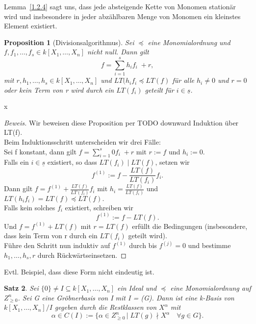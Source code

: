 \documentclass{article}
\newtheorem{satz}{Satz}
\newtheorem{proposition}[satz]{Proposition}
\newcommand*{\R}{k[X_{1},\ldots,X_{n}]}
\begin{document}
	Lemma~\ref{1.2.4} sagt uns, dass jede absteigende Kette von Monomen stationär wird und
	insbesondere in jeder abzählbaren Menge von Monomen ein kleinstes Element existiert.
	

	\begin{proposition}[Divisionsalgorithmus] \label{1.2.5}
	Sei \(\preceq\) eine Monomialordnung und \(f, f_{1}, \ldots, f_{s} \in \R\) nicht null. Dann
	gilt \begin{displaymath} f = \sum_{i=1}^{s} h_{i}f_{i}\; + r, \end{displaymath} mit
	\(r, h_{1}, \ldots, h_{s} \in \R\) und \(LT(h_{i}f_{i} \preceq LT(f)\) für alle \(h_{i} \neq 0
	\) und \(r = 0\) oder kein Term von r wird durch ein \(LT(f_{i})\) geteilt für \(i \in
	\underline{s}\).
	\end{proposition}x

	\begin{proof}[Beweis]
	Wir beweisen diese Proposition per TODO downward Induktion über LT(f). \\
	Beim Induktionsschritt unterscheiden wir drei Fälle:\\
	Sei f konstant, dann gilt \(f = \sum_{i=1}^{s} 0f_{i}\; + r\) mit \(r := f\) und \(h_{i} := 0\). \\
	Falls ein \(i \in \underline{s}\) existiert, so dass \(LT(f_{i})\;| \; LT(f)\), setzen wir
	\begin{displaymath} f^{(1)} := f - \frac{LT(f)}{LT(f_{i})}f_{i}.\end{displaymath} Dann gilt
	\( f = f^{(1)} + \frac{LT(f)}{LT(f_{i})}f_{i} \) mit \(h_{i} = \frac{LT(f)}{LT(f_{i})}\) und 
	\(LT(h_{i}f_{i}) = LT(f) \preceq LT(f).\) \\
	Falls kein solches \(f_{i}\) existiert, schreiben wir \begin{displaymath} f^{(1)} := f -
	LT(f). \end{displaymath} Und \(f = f^{(1)} + LT(f)\) mit \(r = LT(f)\) erfüllt die Bedingungen 
	(insbesondere, dass kein Term von r durch ein \(LT(f_{i})\) geteilt wird). \\
	Führe den Schritt nun induktiv auf \(f^{(1)}\) durch bis \(f^{(j)} = 0\) und bestimme
	\(h_{1}, \ldots, h_{s}, r\) durch Rückwärtseinsetzen.
	\end{proof}

	
	Evtl. Beispiel, dass diese Form nicht eindeutig ist.


	\begin{satz} \label{1.2.8}
	Sei \(\{0\} \neq I \subseteq \R\) ein Ideal und \(\preceq\) eine Monomialordnung auf
	\(Z^{n}_{\geq 0}\). Sei G eine Gröbnerbasis von I mit I = (G). Dann ist eine k-Basis von 
	\(\R/I\) gegeben durch die Restklassen von \(X^{\alpha}\) mit
	\begin{displaymath}
	\alpha \in C(I) := \{\alpha \in Z^{n}_{\geq 0}\, |\; LT(g) \nmid X^{\alpha}\quad \forall g 
	\in G\}.
	\end{displaymath}
	\end{satz}
\end{document}
